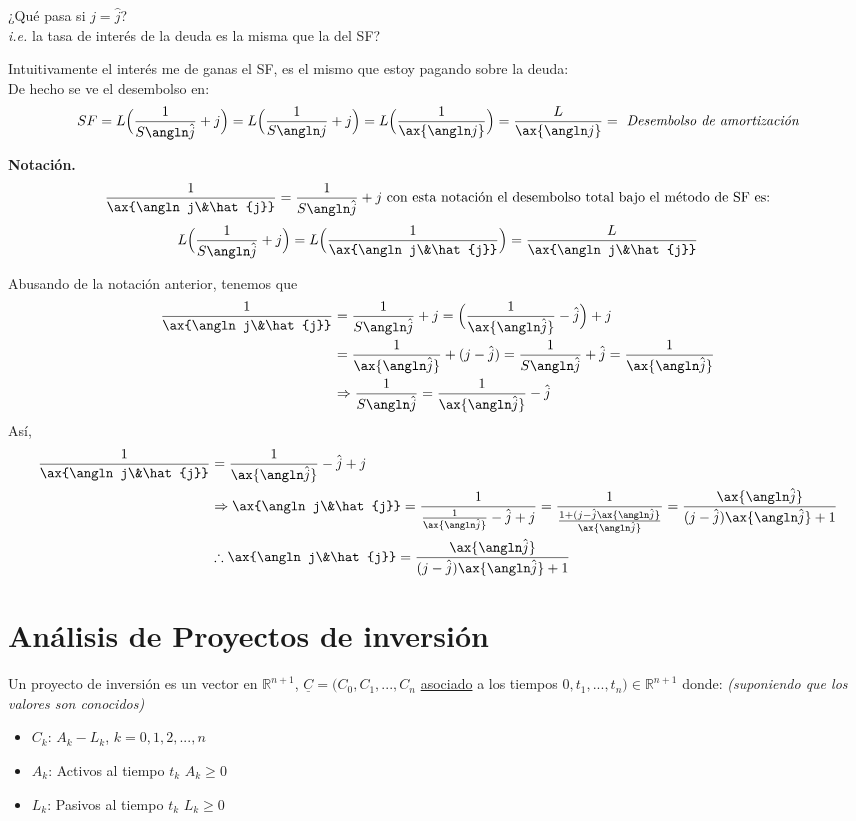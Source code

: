¿Qué pasa si $j=\hat{j}$?\\
\textit{i.e.} la tasa de interés de la deuda es la misma que la del SF?

Intuitivamente el interés me de ganas el SF, es el mismo que estoy pagando sobre la deuda:\\
De hecho se ve el desembolso en:
$$SF = L \Big(\frac{1}{S\angln \hat{j}} + j\Big) = L\Big(\frac{1}{S\angln j} + j\Big) = L\Big(\frac{1}{\ax{\angln j}}\Big) = \frac{L}{\ax{\angln j}} = \textit{ Desembolso de amortización}$$

\textbf{Notación.} \\
$$\frac{1}{\ax{\angln j\&\hat{j}}} = \frac{1}{S\angln\hat{j}} + j \text{ con esta notación el desembolso total bajo el método de SF es:}$$
$$L\Big(\frac{1}{S\angln\hat{j}}+j\Big) = L\Big(\frac{1}{\ax{\angln j\&\hat{j}}}\Big) = \frac{L}{\ax{\angln j\&\hat{j}}}$$

Abusando de la notación anterior, tenemos que
\begin{align*}
    \frac{1}{\ax{\angln j\&\hat{j}}} &= \frac{1}{S\angln\hat{j}} + j = \Big(\frac{1}{\ax{\angln\hat{j}}} - \hat{j}\Big) +j \\
    &= \frac{1}{\ax{\angln\hat{j}}} + (j- \hat{j}) = \frac{1}{S\angln\hat{j}} + \hat{j} = \frac{1}{\ax{\angln\hat{j}}} \\
    &\Rightarrow \frac{1}{S\angln\hat{j}} = \frac{1}{\ax{\angln\hat{j}}} - \hat{j}
\end{align*}
Así,
\begin{align*}
    \frac{1}{\ax{\angln j\&\hat{j}}} &= \frac{1}{\ax{\angln\hat{j}}} - \hat{j} + j\\
    & \Rightarrow \ax{\angln j\&\hat{j}} = \frac{1}{\frac{1}{\ax{\angln\hat{j}}} - \hat{j} + j} = \frac{1}{\frac{1+(j-\hat{j}\ax{\angln \hat{j}}}{\ax{\angln\hat{j}}}} = \frac{\ax{\angln\hat{j}}}{(j-\hat{j})\ax{\angln\hat{j}} + 1}\\
    &\therefore \ax{\angln j\&\hat{j}} = \frac{\ax{\angln\hat{j}}}{(j-\hat{j})\ax{\angln\hat{j}} + 1}
\end{align*}

\section*{Análisis de Proyectos de inversión}
\begin{definition}
Un proyecto de inversión es un vector en $\mathbb{R}^{n+1}$, $\underline{C} = (C_0,C_1, ..., C_n$ \underline{asociado} a los tiempos $0, t_1, ..., t_n)\in\mathbb{R}^{n+1}$ donde: \textit{(suponiendo que los valores son conocidos)}
\begin{itemize}
    \item $C_k$: $A_k - L_k$, $k=0,1,2,...,n$
    \item $A_k$: Activos al tiempo $t_k$ $A_k\geq 0$
    \item $L_k$: Pasivos al tiempo $t_k$ $L_k\geq 0$
\end{itemize}
\end{definition}


